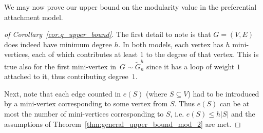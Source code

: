 \documentclass[runningheads, envcountsame, smallextended]{llncs}
\numberwithin{theorem}{section}
\numberwithin{definition}{section}
\numberwithin{lemma}{section}
\numberwithin{corollary}{section}
\numberwithin{proposition}{section}
\numberwithin{conjecture}{section}
\numberwithin{remark}{section}
\numberwithin{equation}{section}
\begin{document}
	We may now prove our upper bound on the modularity value in the preferential attachment model.

    
\begin{proof}[of Corollary~\ref{cor.q_upper_bound}] 
	The first detail to note is that $G=(V,E)$ does indeed have minimum degree $h$. In both models, each vertex has $h$ mini-vertices, each of which contributes at least $1$ to the degree of that vertex.
	This is true also for the first mini-vertex in~$G \sim \tilde{G}_n^h$ since it has a loop of weight $1$ attached to it, thus contributing degree~$1$.
	
	Next, note that each edge counted in $e(S)$ (where $S \subseteq V$) had to be introduced by a mini-vertex corresponding to some vertex from $S$. Thus $e(S)$ can be at most the number of mini-vertices corresponding to $S$, i.e. $e(S) \leq h|S|$  and the assumptions of Theorem~\ref{thm:general_upper_bound_mod_2} are met.
	

\end{proof}
\end{document}
